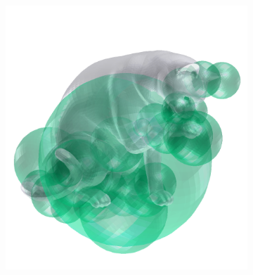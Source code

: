 \begin{figure}[t]
\begin{subfigure}[t]{0.30\linewidth}
		\label{fig/eval/testshapes/harris}
	\end{subfigure} \\ 
	\begin{subfigure}[t]{0.30\linewidth} 
		\centering 
		\includegraphics[width=1\linewidth]{./fig/eval/cat_hessian.png} 
		\label{fig/eval/testshapes/hessian}
	\end{subfigure}
	\begin{subfigure}[t]{0.30\linewidth} 
		\centering 

\end{subfigure}
\end{figure}

